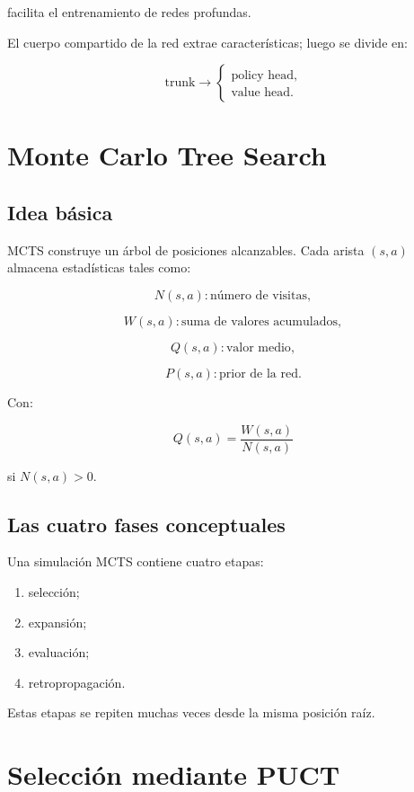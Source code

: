 \documentclass[11pt,a4paper]{article}
\begin{document}
facilita el entrenamiento de redes profundas.

El cuerpo compartido de la red extrae características; luego se divide en:

\[
\text{trunk}
\longrightarrow
\begin{cases}
\text{policy head},\\
\text{value head}.
\end{cases}
\]

\section{Monte Carlo Tree Search}

\subsection{Idea básica}

MCTS construye un árbol de posiciones alcanzables. Cada arista \((s,a)\) almacena estadísticas tales como:

\[
N(s,a): \text{número de visitas},
\]

\[
W(s,a): \text{suma de valores acumulados},
\]

\[
Q(s,a): \text{valor medio},
\]

\[
P(s,a): \text{prior de la red}.
\]

Con:

\[
Q(s,a)
=
\frac{W(s,a)}{N(s,a)}
\]

si \(N(s,a)>0\).

\subsection{Las cuatro fases conceptuales}

Una simulación MCTS contiene cuatro etapas:

\begin{enumerate}
    \item selección;
    \item expansión;
    \item evaluación;
    \item retropropagación.
\end{enumerate}

Estas etapas se repiten muchas veces desde la misma posición raíz.

\section{Selección mediante PUCT}
\end{document}
